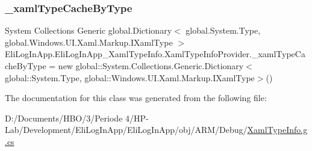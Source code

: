 \mbox{\label{class_eli_log_in_app_1_1_eli_log_in_app___xaml_type_info_1_1_xaml_type_info_provider_a433a09da46883bcad8c12c74d16e5b84}} 
\subsubsection{\texorpdfstring{\+\_\+xaml\+Type\+Cache\+By\+Type}{\_xamlTypeCacheByType}}
{\footnotesize\ttfamily System Collections Generic global.\+Dictionary$<$ global.\+System.\+Type, global.\+Windows.\+U\+I.\+Xaml.\+Markup.\+I\+Xaml\+Type $>$ Eli\+Log\+In\+App.\+Eli\+Log\+In\+App\+\_\+\+Xaml\+Type\+Info.\+Xaml\+Type\+Info\+Provider.\+\_\+xaml\+Type\+Cache\+By\+Type = new global\+::\+System.\+Collections.\+Generic.\+Dictionary$<$global\+::\+System.\+Type, global\+::\+Windows.\+U\+I.\+Xaml.\+Markup.\+I\+Xaml\+Type$>$()\hspace{0.3cm}{\ttfamily [private]}}



The documentation for this class was generated from the following file\+:\begin{DoxyCompactItemize}
\item 
D\+:/\+Documents/\+H\+B\+O/3/\+Periode 4/\+H\+P-\/\+Lab/\+Development/\+Eli\+Log\+In\+App/\+Eli\+Log\+In\+App/obj/\+A\+R\+M/\+Debug/\hyperlink{_eli_log_in_app_2_eli_log_in_app_2obj_2_a_r_m_2_debug_2_xaml_type_info_8g_8cs}{Xaml\+Type\+Info.\+g.\+cs}\end{DoxyCompactItemize}
